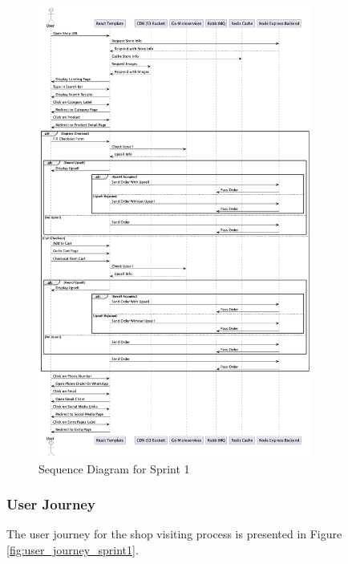 \begin{figure}[H]
    \centering
    \includegraphics[width=0.8\textwidth]{images/sprintOneSequence.png}
    \caption{Sequence Diagram for Sprint 1}
    \label{fig:sequence_diagram_sprint1}
\end{figure}

\subsubsection{User Journey}

The user journey for the shop visiting process is presented in Figure \ref{fig:user_journey_sprint1}.

